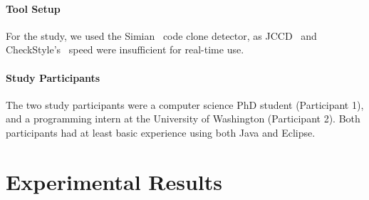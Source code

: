 \documentclass[nocopyrightspace,10pt]{sigplanconf}
\begin{document}
\paragraph{Tool Setup}
For the study, we used the Simian~\cite{Simian} code clone detector,
as JCCD~\cite{JCCD} and CheckStyle's~\cite{CheckStyle} speed were
insufficient for real-time use.

\paragraph{Study Participants}
The two study participants were a computer science PhD student (Participant 1), and a
programming intern at the University of Washington (Participant 2). Both participants
had at least basic experience using both Java and Eclipse.

\section{Experimental Results}
\label{sec:results}


\end{document}
